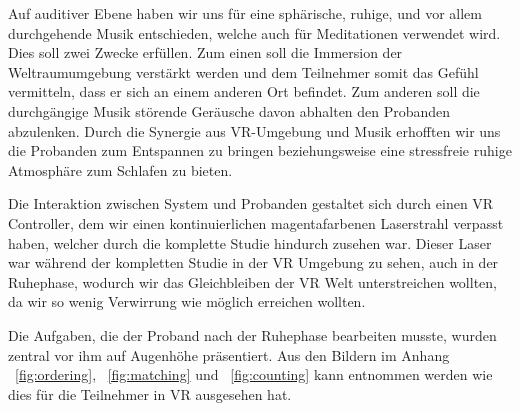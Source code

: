 Auf auditiver Ebene haben wir uns für eine sphärische, ruhige, und vor allem durchgehende Musik entschieden, welche auch für Meditationen verwendet wird. Dies soll zwei Zwecke erfüllen. Zum einen soll die Immersion der Weltraumumgebung verstärkt werden und dem Teilnehmer somit das Gefühl vermitteln, dass er sich an einem anderen Ort befindet. Zum anderen soll die durchgängige Musik störende Geräusche davon abhalten den Probanden abzulenken.
Durch die Synergie aus VR-Umgebung und Musik erhofften wir uns die Probanden zum Entspannen zu bringen beziehungsweise eine stressfreie ruhige Atmosphäre zum Schlafen zu bieten.

Die Interaktion zwischen System und Probanden gestaltet sich durch einen VR Controller, dem wir einen kontinuierlichen magentafarbenen Laserstrahl verpasst haben, welcher durch die komplette Studie hindurch zusehen war. Dieser Laser war während der kompletten Studie in der VR Umgebung zu sehen, auch in der Ruhephase, wodurch wir das Gleichbleiben der VR Welt unterstreichen wollten, da wir so wenig Verwirrung wie möglich erreichen wollten.

Die Aufgaben, die der Proband nach der Ruhephase bearbeiten musste, wurden zentral vor ihm auf Augenhöhe präsentiert. Aus den Bildern im Anhang ~\ref{fig:ordering}, ~\ref{fig:matching} und ~\ref{fig:counting} kann entnommen werden wie dies für die Teilnehmer in VR ausgesehen hat.
